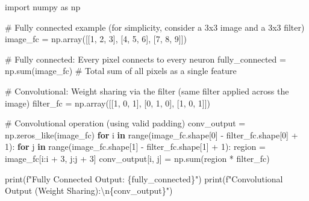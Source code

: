 \documentclass[
  letterpaper,
  DIV=11,
  numbers=noendperiod]{scrreprt}
\newenvironment{Shaded}{\begin{snugshade}}{\end{snugshade}}
\newcommand{\BuiltInTok}[1]{\textcolor[rgb]{0.00,0.23,0.31}{#1}}
\newcommand{\CharTok}[1]{\textcolor[rgb]{0.13,0.47,0.30}{#1}}
\newcommand{\CommentTok}[1]{\textcolor[rgb]{0.37,0.37,0.37}{#1}}
\newcommand{\ControlFlowTok}[1]{\textcolor[rgb]{0.00,0.23,0.31}{\textbf{#1}}}
\newcommand{\DecValTok}[1]{\textcolor[rgb]{0.68,0.00,0.00}{#1}}
\newcommand{\ImportTok}[1]{\textcolor[rgb]{0.00,0.46,0.62}{#1}}
\newcommand{\KeywordTok}[1]{\textcolor[rgb]{0.00,0.23,0.31}{\textbf{#1}}}
\newcommand{\NormalTok}[1]{\textcolor[rgb]{0.00,0.23,0.31}{#1}}
\newcommand{\OperatorTok}[1]{\textcolor[rgb]{0.37,0.37,0.37}{#1}}
\newcommand{\SpecialCharTok}[1]{\textcolor[rgb]{0.37,0.37,0.37}{#1}}
\newcommand{\SpecialStringTok}[1]{\textcolor[rgb]{0.13,0.47,0.30}{#1}}
\begin{document}
\begin{Shaded}
\begin{Highlighting}[]
\ImportTok{import}\NormalTok{ numpy }\ImportTok{as}\NormalTok{ np}

\CommentTok{\# Fully connected example (for simplicity, consider a 3x3 image and a 3x3 filter)}
\NormalTok{image\_fc }\OperatorTok{=}\NormalTok{ np.array([[}\DecValTok{1}\NormalTok{, }\DecValTok{2}\NormalTok{, }\DecValTok{3}\NormalTok{],}
\NormalTok{                     [}\DecValTok{4}\NormalTok{, }\DecValTok{5}\NormalTok{, }\DecValTok{6}\NormalTok{],}
\NormalTok{                     [}\DecValTok{7}\NormalTok{, }\DecValTok{8}\NormalTok{, }\DecValTok{9}\NormalTok{]])}

\CommentTok{\# Fully connected: Every pixel connects to every neuron}
\NormalTok{fully\_connected }\OperatorTok{=}\NormalTok{ np.}\BuiltInTok{sum}\NormalTok{(image\_fc)  }\CommentTok{\# Total sum of all pixels as a single feature}

\CommentTok{\# Convolutional: Weight sharing via the filter (same filter applied across the image)}
\NormalTok{filter\_fc }\OperatorTok{=}\NormalTok{ np.array([[}\DecValTok{1}\NormalTok{, }\DecValTok{0}\NormalTok{, }\DecValTok{1}\NormalTok{],}
\NormalTok{                      [}\DecValTok{0}\NormalTok{, }\DecValTok{1}\NormalTok{, }\DecValTok{0}\NormalTok{],}
\NormalTok{                      [}\DecValTok{1}\NormalTok{, }\DecValTok{0}\NormalTok{, }\DecValTok{1}\NormalTok{]])}

\CommentTok{\# Convolutional operation (using valid padding)}
\NormalTok{conv\_output }\OperatorTok{=}\NormalTok{ np.zeros\_like(image\_fc)}
\ControlFlowTok{for}\NormalTok{ i }\KeywordTok{in} \BuiltInTok{range}\NormalTok{(image\_fc.shape[}\DecValTok{0}\NormalTok{] }\OperatorTok{{-}}\NormalTok{ filter\_fc.shape[}\DecValTok{0}\NormalTok{] }\OperatorTok{+} \DecValTok{1}\NormalTok{):}
    \ControlFlowTok{for}\NormalTok{ j }\KeywordTok{in} \BuiltInTok{range}\NormalTok{(image\_fc.shape[}\DecValTok{1}\NormalTok{] }\OperatorTok{{-}}\NormalTok{ filter\_fc.shape[}\DecValTok{1}\NormalTok{] }\OperatorTok{+} \DecValTok{1}\NormalTok{):}
\NormalTok{        region }\OperatorTok{=}\NormalTok{ image\_fc[i:i }\OperatorTok{+} \DecValTok{3}\NormalTok{, j:j }\OperatorTok{+} \DecValTok{3}\NormalTok{]}
\NormalTok{        conv\_output[i, j] }\OperatorTok{=}\NormalTok{ np.}\BuiltInTok{sum}\NormalTok{(region }\OperatorTok{*}\NormalTok{ filter\_fc)}

\BuiltInTok{print}\NormalTok{(}\SpecialStringTok{f"Fully Connected Output: }\SpecialCharTok{\{}\NormalTok{fully\_connected}\SpecialCharTok{\}}\SpecialStringTok{"}\NormalTok{)}
\BuiltInTok{print}\NormalTok{(}\SpecialStringTok{f"Convolutional Output (Weight Sharing):}\CharTok{\textbackslash{}n}\SpecialCharTok{\{}\NormalTok{conv\_output}\SpecialCharTok{\}}\SpecialStringTok{"}\NormalTok{)}
\end{Highlighting}
\end{Shaded}
\end{document}
